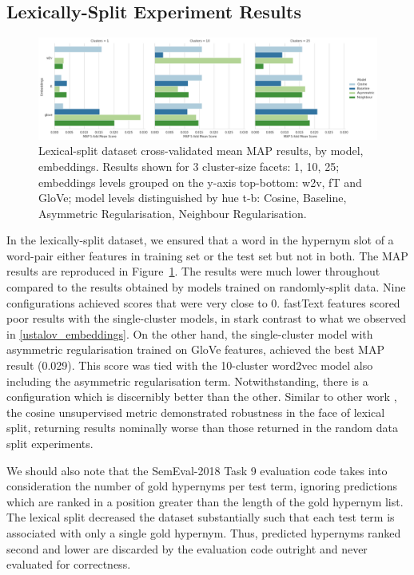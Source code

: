 \subsection{Lexically-Split Experiment Results}
\begin{figure}[ht!] 
  \centering
  \includegraphics[width=1.\linewidth]{images/MAP_lexical_split_results_models_baseline_embeddings.png}
  \caption[Lexical-split dataset cross-validated mean MAP results, by model, embeddings]{Lexical-split dataset cross-validated mean MAP results, by model, embeddings.  Results shown for 3 cluster-size facets: 1, 10, 25; embeddings levels grouped on the y-axis top-bottom: w2v, fT and GloVe; model levels distinguished by hue t-b: Cosine, Baseline, Asymmetric Regularisation, Neighbour Regularisation.}
  \label{fig:lexsplit_ustalov_map}
\end{figure}
In the lexically-split dataset, we ensured that a word in the hypernym slot of a word-pair either features in training set or the test set but not in both.  The \ac{MAP} results are reproduced in Figure~\ref{fig:lexsplit_ustalov_map}.  The results were much lower throughout compared to the results obtained by models trained on randomly-split data.  Nine configurations achieved scores that were very close to 0.  fastText features scored poor results with the single-cluster models, in stark contrast to what we observed in \cref{ustalov_embeddings}.  On the other hand, the single-cluster model with asymmetric regularisation trained on GloVe features, achieved the best \ac{MAP} result (0.029).  This score was tied with the 10-cluster word2vec model also including the asymmetric regularisation term.  Notwithstanding, there is a configuration which is discernibly better than the other.  Similar to other work \citep{shwartz2017siege}, the cosine unsupervised metric demonstrated robustness in the face of lexical split, returning results nominally worse than those returned in the random data split experiments.

We should also note that the SemEval-2018 Task 9 evaluation code takes into consideration the number of gold hypernyms per test term, ignoring predictions which are ranked in a position greater than the length of the gold hypernym list.  The lexical split decreased the dataset substantially such that each test term is associated with only a single gold hypernym.  Thus, predicted hypernyms ranked second and lower are discarded by the evaluation code outright and never evaluated for correctness.  

